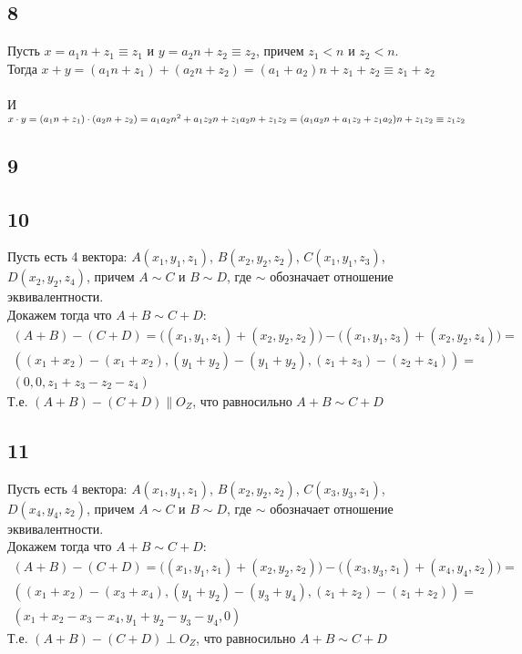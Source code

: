 		\subsection{8}
		Пусть $x = a_1n+ z_1 \equiv z_1$ и $y = a_2n + z_2 \equiv z_2$, причем $z_1 < n$ и $z_2 < n$.\\
		Тогда $x + y = (a_1n+ z_1) + (a_2n + z_2) = (a_1 + a_2)n + z_1 + z_2 \equiv z_1 + z_2 $ \\ \\
		И $x  \cdot  y = (a_1n+ z_1)  \cdot  (a_2n + z_2) = a_{1}a_{2}n^{2} + a_{1}z_{2}n + z_{1}a_{2}n + z_{1}z_{2} =\\
		(a_{1}a_{2}n + a_{1}z_{2} + z_{1}a_{2})n + z_{1}z_{2} \equiv z_{1}z_{2} $
		
		\subsection{9}
		
		\subsection{10}
		Пусть есть 4 вектора: $A(x_{1}, y_{1}, z_{1})$, $B(x_{2}, y_{2}, z_{2})$, $C(x_{1}, y_{1}, z_{3})$, $D(x_{2}, y_{2}, z_{4})$, причем $A \sim C$ и $B \sim D$, где $\sim$ обозначает отношение эквивалентности.\\
		Докажем тогда что $A+B \sim C+D$:
		\begin{gather*}
			(A+B) - (C+D) = 
			\biggl( (x_{1}, y_{1}, z_{1}) + (x_{2}, y_{2}, z_{2}) \biggl) - \biggl( (x_{1}, y_{1}, z_{3}) + (x_{2}, y_{2}, z_{4}) \biggl) = \\
			((x_{1} + x_{2}) - (x_{1} + x_{2}), (y_{1} + y_{2}) - (y_{1} + y_{2}), (z_{1} + z_{3}) - (z_{2} + z_{4})) = \\
			(0, 0, z_{1} + z_{3} - z_{2} - z_{4})
		\end{gather*}
		Т.е. $(A+B) - (C+D) \parallel O_{Z}$, что равносильно $A+B \sim C+D$
		
		
		\subsection{11}
		Пусть есть 4 вектора: $A(x_{1}, y_{1}, z_{1})$, $B(x_{2}, y_{2}, z_{2})$, $C(x_{3}, y_{3}, z_{1})$, $D(x_{4}, y_{4}, z_{2})$, причем $A \sim C$ и $B \sim D$, где $\sim$ обозначает отношение эквивалентности.\\
		Докажем тогда что $A+B \sim C+D$:
		\begin{gather*}
			(A+B) - (C+D) = 
			\biggl( (x_{1}, y_{1}, z_{1}) + (x_{2}, y_{2}, z_{2}) \biggl) - \biggl( (x_{3}, y_{3}, z_{1}) + (x_{4}, y_{4}, z_{2}) \biggl) = \\
			((x_{1} + x_{2}) - (x_{3} + x_{4}), (y_{1} + y_{2}) - (y_{3} + y_{4}), (z_{1} + z_{2}) - (z_{1} + z_{2})) = \\
			(x_{1} + x_{2} - x_{3} - x_{4}, y_{1} + y_{2} - y_{3} - y_{4}, 0)
		\end{gather*}
		Т.е. $(A+B) - (C+D) \perp O_{Z}$, что равносильно $A+B \sim C+D$
		
